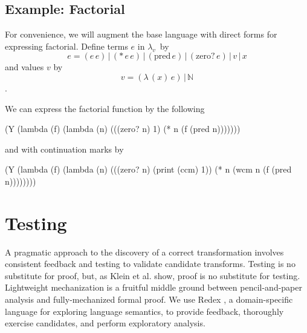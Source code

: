 \documentclass{llncs}
\newcommand{\lv}[0]{$\lambda_v$}
\newcommand{\app}[2]{(#1\,#2)}
\newcommand{\abs}[2]{(\lambda\,(#1)\,#2)}
\begin{document}

\subsection{Example: Factorial}

For convenience, we will augment the base language with direct forms for expressing factorial. Define terms $e$ in \lv\ by
\begin{equation}
e=\app{e}{e}\,|\,(*\,e\,e)\,|\,\app{\mathrm{pred}}{e}\,|\,\app{\mathrm{zero?}}{e}\,|\,v\,|\,x
\end{equation}
and values $v$ by
\begin{equation}
v=\abs{x}{e}\,|\,\mathbb{N}
\end{equation}
.

We can express the factorial function by the following
\begin{schemedisplay}
(Y (lambda (f)
     (lambda (n)
       (((zero? n)
         1)
        (* n (f (pred n)))))))
\end{schemedisplay}

and with continuation marks by
\begin{schemedisplay}
(Y (lambda (f)
     (lambda (n)
       (((zero? n)
         (print (ccm) 1))
        (* n (wcm n (f (pred n))))))))
\end{schemedisplay}

\section{Testing}

A pragmatic approach to the discovery of a correct transformation involves consistent feedback and testing to validate candidate transforms. Testing is no substitute for proof, but, as Klein et al. \cite{klein2012run} show, proof is no substitute for testing. Lightweight mechanization is a fruitful middle ground between pencil-and-paper analysis and fully-mechanized formal proof. We use Redex \cite{findler2010redex}, a domain-specific language for exploring language semantics, to provide feedback, thoroughly exercise candidates, and perform exploratory analysis.


\setspecialsymbol{->}{$\to$}
\setspecialsymbol{-->}{$\rightarrow$}
\end{document}
